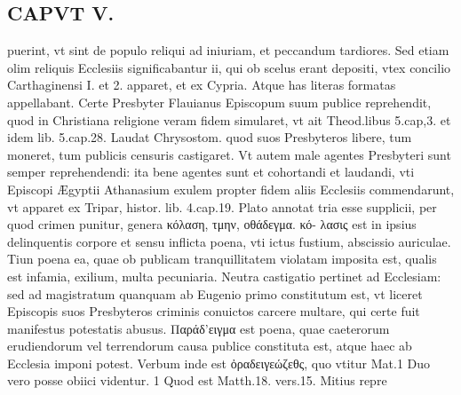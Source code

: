 \documentclass{article}
\begin{document}
\begin{pages}
\section*{CAPVT  V. }
\marginpar{[ p.317 ]}\pstart puerint, vt sint de populo reliqui ad iniuriam, et peccandum tardiores. Sed etiam olim reliquis Ecclesiis significabantur ii, qui ob scelus erant depositi, vtex concilio Carthaginensi I. et 2. apparet, et ex Cypria. Atque has literas formatas appellabant. Certe Presbyter Flauianus Episcopum suum publice reprehendit, quod in Christiana religione veram fidem simularet, vt ait Theod.libus 5.cap,3. et idem lib.  5.cap.28. Laudat Chrysostom. quod suos Presbyteros libere, tum moneret, tum publicis censuris castigaret. Vt autem male agentes Presbyteri sunt semper reprehendendi: ita bene agentes sunt et cohortandi et laudandi, vti Episcopi Ægyptii Athanasium exulem propter fidem aliis Ecclesiis commendarunt, vt apparet ex Tripar, histor. lib.  4.cap.19. Plato annotat tria esse supplicii, per quod crimen punitur, genera κόλαση, τμην, οθάδεγμα. κό- λασις est in ipsius delinquentis corpore et sensu inflicta poena, vti ictus fustium, abscissio auriculae. Tiun poena ea, quae ob publicam tranquillitatem violatam imposita est, qualis est infamia, exilium, multa pecuniaria. Neutra castigatio pertinet ad Ecclesiam: sed ad magistratum quanquam ab Eugenio primo constitutum est, vt liceret Episcopis suos Presbyteros criminis conuictos carcere multare, qui certe fuit manifestus potestatis abusus. Παράδ'ειγμα est poena, quae caeterorum erudiendorum vel terrendorum causa publice constituta est, atque haec ab Ecclesia imponi potest. Verbum inde est ὀραδειγεώζεθς, quo vtitur Mat.1 Duo vero posse obiici videntur. 1 Quod est Matth.18. vers.15. Mitius repre\pend

\end{pages}
\end{document}
